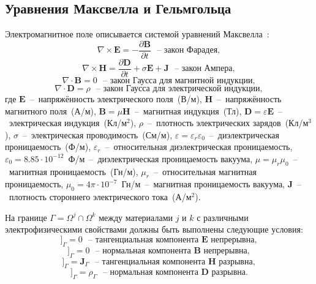 \documentclass[a4paper,14pt]{article}
\newcommand{\Jmp}[1]{[\![ { #1 } ]\!]}
\begin{document}
\subsection{Уравнения Максвелла и Гельмгольца}
Электромагнитное поле описывается системой уравнений Максвелла~\citep{epov}:
\begin{equation}
	\nabla \times \mathbf{E} = - \frac{ \partial \mathbf{B} }{ \partial t } \text{~~--~закон Фарадея}, \label{eq:maxwell:faradey}
\end{equation}
\begin{equation}
	\nabla \times \mathbf{H} = \frac{ \partial \mathbf{D} }{ \partial t } + \sigma \mathbf{E} + \mathbf{J} \text{~~--~закон Ампера}, \label{eq:maxwell:amper}
\end{equation}
\begin{equation*}
	\nabla \cdot \mathbf{B} = 0 \text{~~--~закон Гаусса для магнитной индукции}, \label{eq:maxwell:gauss_magn}
\end{equation*}
\begin{equation*}
	\nabla \cdot \mathbf{D} = \rho \text{~~--~закон Гаусса для электрической индукции}, \label{eq:maxwell:gauss_elect}
\end{equation*}
где $\mathbf{E}$~--~напряжённость электрического поля~(В/м), $\mathbf{H}$~--~напряжённость магнитного поля~(А/м), $\mathbf{B}=\mu \mathbf{H}$~--~магнитная индукция~(Тл), $\mathbf{D}=\varepsilon \mathbf{E}$~--~электрическая индукция~(Кл/м${}^2$), $\rho$~--~плотность электрических зарядов~(Кл/м${}^3$), $\sigma$~--~электрическая проводимость~(См/м), $\varepsilon = \varepsilon_r \varepsilon_0$~--~диэлектрическая проницаемость~(Ф/м), $\varepsilon_r$~--~относительная диэлектрическая проницаемость, $\varepsilon_0 = 8.85 \cdot 10^{-12}$~Ф/м~--~диэлектрическая проницаемость вакуума, $\mu = \mu_r \mu_0$~--~магнитная проницаемость~(Гн/м), $\mu_r$~--~относительная магнитная проницаемость, $\mu_0 = 4 \pi \cdot 10^{-7}$~Гн/м~--~магнитная проницаемость вакуума, $\mathbf{J}$~--~плотность стороннего электрического тока~(А/м${}^2$).

На границе $\Gamma = \Omega^j \cap \Omega^k$ между материалами $j$ и $k$ с различными электрофизическими свойствами должны быть выполнены следующие условия:
\begin{equation}
	\Jmp{ \mathbf{E} \times \mathbf{n} }_{\Gamma} = 0 \text{~~--~тангенциальная компонента $\mathbf{E}$ непрерывна}, \label{eq:maxwell:tangent_E}
\end{equation}
\begin{equation*}
	\Jmp{ \mathbf{B} \cdot \mathbf{n} }_{\Gamma} = 0 \text{~~--~нормальная компонента $\mathbf{B}$ непрерывна}, \label{eq:maxwell:normal_B}
\end{equation*}
\begin{equation*}
	\Jmp{ \mathbf{H} \times \mathbf{n} }_{\Gamma} = \mathbf{J}_{\Gamma} \text{~~--~тангенциальная компонента $\mathbf{H}$ разрывна}, \label{eq:maxwell:tangent_H}
\end{equation*}
\begin{equation}
	\Jmp{ \mathbf{D} \cdot \mathbf{n} }_{\Gamma} = \rho_{\Gamma} \text{~~--~нормальная компонента $\mathbf{D}$ разрывна}. \label{eq:maxwell:normal_D}
\end{equation}
\end{document}
